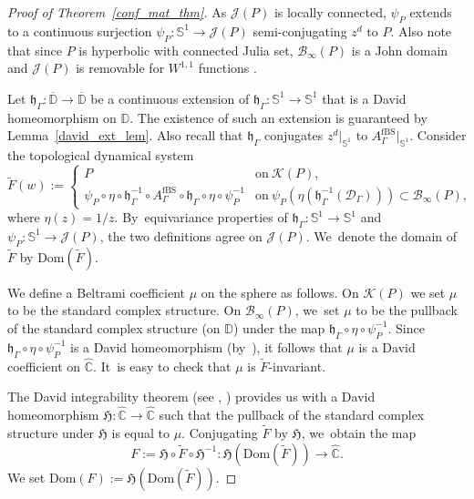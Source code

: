 \documentclass[10pt,a4paper]{amsart}
\theoremstyle{definition}
\theoremstyle{remark}
\newcommand{\C}{\mathbb{C}}
\newcommand{\D}{\mathbb{D}}
\begin{document}
\begin{proof}[Proof of Theorem~\ref{conf_mat_thm}]
As $\mathcal{J}(P)$ is locally connected, $\psi_P$ extends to a continuous surjection $\psi_P:\mathbb{S}^1\to\mathcal{J}(P)$ semi-conjugating $z^d$ to $P$. Also note that since $P$ is hyperbolic with connected Julia set, $\mathcal{B}_\infty(P)$ is a John domain and $\mathcal{J}(P)$ is removable for $W^{1,1}$ functions \cite[Th.\,4]{JS00}.

Let $\mathfrak{h}_\Gamma:\overline{\D}\to\overline{\D}$ be a continuous extension of $\mathfrak{h}_\Gamma:\mathbb{S}^1\to\mathbb{S}^1$ that is a David homeomorphism on $\D$. The existence of such an extension is guaranteed by Lemma~\ref{david_ext_lem}.
Also recall that $\mathfrak{h}_\Gamma$ conjugates $z^d\vert_{\mathbb{S}^1}$ to $A_{\Gamma}^{\mathrm{fBS}}\vert_{\mathbb{S}^1}$.
Consider the topological dynamical system
\begin{equation*}
\widetilde{F}(w):=\begin{cases}
P & \text{on}\ \mathcal{K}(P), \\
\psi_P\circ\eta\circ\mathfrak{h}_\Gamma^{-1}\circ A_{\Gamma}^{\mathrm{fBS}}\circ\mathfrak{h}_\Gamma\circ\eta\circ\psi_P^{-1} & \text{on}\ \psi_P\left(\eta\left(\mathfrak{h}_\Gamma^{-1}\left(\mathcal{D}_{\Gamma}\right)\right)\right)\subset\mathcal{B}_\infty(P),
\end{cases}
\end{equation*}
where $\eta(z)=1/z$. By~equivariance properties of $\mathfrak{h}_\Gamma:\mathbb{S}^1\to\mathbb{S}^1$ and $\psi_P:\mathbb{S}^1\to\mathcal{J}(P)$, the two definitions agree on $\mathcal{J}(P)$. We~denote the domain of $\widetilde{F}$ by $\mathrm{Dom}(\widetilde{F})$.

We define a Beltrami coefficient $\mu$ on the sphere as follows. On $\mathcal{K}(P)$ we set $\mu$ to be
the standard complex structure. On $\mathcal{B}_\infty(P)$, we~set $\mu$ to be the pullback of the standard complex structure (on $\D$) under the map $\mathfrak{h}_\Gamma\circ\eta\circ\psi_P^{-1}$. Since $\mathfrak{h}_\Gamma\circ\eta\circ\psi_P^{-1}$ is a David homeomorphism (by~\cite[Prop.\,2.5(iv)]{LMMN}), it follows that $\mu$ is a David coefficient on $\widehat{\C}$. It~is easy to check that $\mu$ is $\widetilde{F}$-invariant.

The David integrability theorem (see \cite{David}, \cite[Th.\,20.6.2, p.\,578]{AIM09}) provides us with a David homeomorphism $\mathfrak{H}:\widehat{\C}\to\widehat{\C}$ such that the pullback of the standard complex structure under $\mathfrak{H}$ is equal to $\mu$. Conjugating $\widetilde{F}$ by $\mathfrak{H}$, we~obtain the map
\[
F:=\mathfrak{H}\circ\widetilde{F}\circ\mathfrak{H}^{-1}:\mathfrak{H}(\mathrm{Dom}(\widetilde{F}))\to\widehat{\C}.
\]
We set $\mathrm{Dom}(F):= \mathfrak{H}(\mathrm{Dom}(\widetilde{F}))$.


\end{proof}
\end{document}

